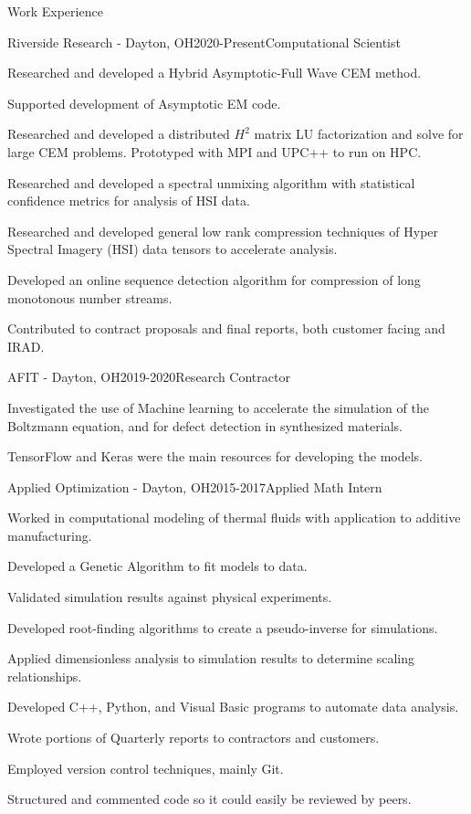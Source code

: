 \documentclass{resume} %
\begin{document}
\begin{rSection}{Work Experience}

\begin{rSubsection}{Riverside Research - Dayton, OH}{2020-Present}{Computational Scientist}{}
\item Researched and developed a Hybrid Asymptotic-Full Wave CEM method.
\item Supported development of Asymptotic EM code.
\item Researched and developed a distributed $H^2$ matrix LU factorization and solve for large CEM problems. Prototyped with MPI and UPC++ to run on HPC.
\item Researched and developed a spectral unmixing algorithm with statistical confidence metrics for analysis of HSI data.
\item Researched and developed general low rank compression techniques of Hyper Spectral Imagery (HSI) data tensors to accelerate analysis.
\item Developed an online sequence detection algorithm for compression of long monotonous number streams.
\item Contributed to contract proposals and final reports, both customer facing and IRAD.
\end{rSubsection}

\begin{rSubsection}{AFIT - Dayton, OH}{2019-2020}{Research Contractor}{}
\item Investigated the use of Machine learning to accelerate the simulation of the Boltzmann equation, and for defect detection in synthesized materials. 
\item TensorFlow and Keras were the main resources for developing the models.
\end{rSubsection}

\begin{rSubsection}{Applied Optimization - Dayton, OH}{2015-2017}{Applied Math Intern}{}
\item Worked in computational modeling of thermal fluids with application to additive manufacturing.
\item Developed a Genetic Algorithm to fit models to data.
\item Validated simulation results against physical experiments.
\item Developed root-finding algorithms to create a pseudo-inverse for simulations.
\item Applied dimensionless analysis to simulation results to determine scaling relationships.
\item Developed C++, Python, and Visual Basic programs to automate data analysis.
\item Wrote portions of Quarterly reports to contractors and customers.
\item Employed version control techniques, mainly Git.
\item Structured and commented code so it could easily be reviewed by peers.
\end{rSubsection}


\end{rSection}
\end{document}
